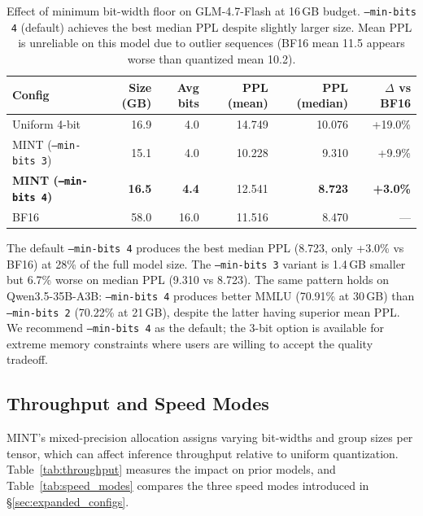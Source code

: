 \documentclass{article}
\begin{document}
\begin{table}[h]
\centering
\caption{Effect of minimum bit-width floor on GLM-4.7-Flash at 16\,GB budget. \texttt{--min-bits 4} (default) achieves the best median PPL despite slightly larger size. Mean PPL is unreliable on this model due to outlier sequences (BF16 mean 11.5 appears worse than quantized mean 10.2).}
\label{tab:minbits}
\begin{tabular}{lrrrrr}
\toprule
Config & Size (GB) & Avg bits & PPL (mean) & PPL (median) & $\Delta$ vs BF16 \\
\midrule
Uniform 4-bit & 16.9 & 4.0 & 14.749 & 10.076 & +19.0\% \\
MINT (\texttt{--min-bits 3}) & 15.1 & 4.0 & 10.228 & 9.310 & +9.9\% \\
\textbf{MINT (\texttt{--min-bits 4})} & \textbf{16.5} & \textbf{4.4} & 12.541 & \textbf{8.723} & \textbf{+3.0\%} \\
BF16 & 58.0 & 16.0 & 11.516 & 8.470 & --- \\
\bottomrule
\end{tabular}
\end{table}

The default \texttt{--min-bits 4} produces the best median PPL (8.723, only +3.0\% vs BF16) at 28\% of the full model size. The \texttt{--min-bits 3} variant is 1.4\,GB smaller but 6.7\% worse on median PPL (9.310 vs 8.723). The same pattern holds on Qwen3.5-35B-A3B: \texttt{--min-bits 4} produces better MMLU (70.91\% at 30\,GB) than \texttt{--min-bits 2} (70.22\% at 21\,GB), despite the latter having superior mean PPL. We recommend \texttt{--min-bits 4} as the default; the 3-bit option is available for extreme memory constraints where users are willing to accept the quality tradeoff.

\subsection{Throughput and Speed Modes}
\label{sec:throughput}

MINT's mixed-precision allocation assigns varying bit-widths and group sizes per tensor, which can affect inference throughput relative to uniform quantization. Table~\ref{tab:throughput} measures the impact on prior models, and Table~\ref{tab:speed_modes} compares the three speed modes introduced in \S\ref{sec:expanded_configs}.
\end{document}
